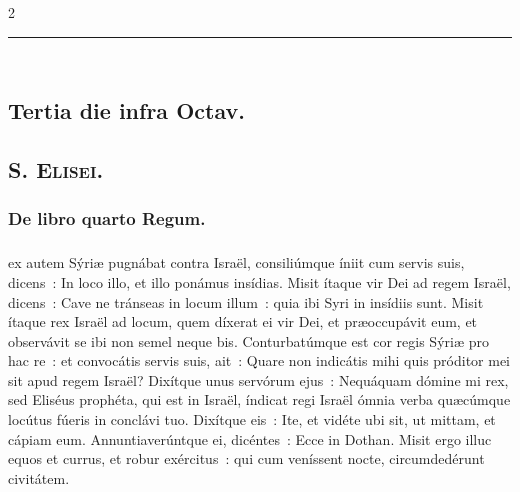 \documentclass[9pt,twoside]{extarticle}
\begin{document}
\begin{multicols}{2}
{\begin{center}\textcolor{red}{\rule{\linewidth}{0.5pt}} \end{center}

\subsection*{\center {}\\ Tertia die infra Octav.}
\subsection*{\center \textsc{S. Elisei.}}
\subsubsection*{\center {}}

\subsubsection*{\center De libro quarto Regum.}
\subsubsection*{\center {}}
ex autem Sýriæ pugnábat contra Israël, consiliúmque íniit cum servis suis, dicens~: In loco illo, et illo ponámus insídias.
Misit ítaque vir Dei ad regem Israël, dicens~: Cave ne tránseas in locum illum~: quia ibi Syri in insídiis sunt.
Misit ítaque rex Israël ad locum, quem díxerat ei vir Dei, et præoccupávit eum, et observávit se ibi non semel neque bis.
Conturbatúmque est cor regis Sýriæ pro hac re~: et convocátis servis suis, ait~: Quare non indicátis mihi quis próditor mei sit apud regem Israël?
Dixítque unus servórum ejus~: Nequáquam dómine mi rex, sed Eliséus prophéta, qui est in Israël, índicat regi Israël ómnia verba quæcúmque locútus fúeris in conclávi tuo.
Dixítque eis~: Ite, et vidéte ubi sit, ut mittam, et cápiam eum. Annuntiaverúntque ei, dicéntes~: Ecce in Dothan.
Misit ergo illuc equos et currus, et robur exércitus~: qui cum veníssent nocte, circumdedérunt civitátem.

\begin{tightlist}{}
\item {}
\end{tightlist}

}
\end{multicols}
\end{document}
